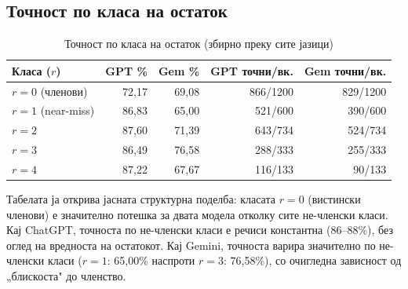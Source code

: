 \documentclass[12pt,a4paper]{article}
\theoremstyle{definition}
\begin{document}
\subsection{Точност по класа на остаток}
\label{subsec:residue_accuracy}

\begin{table}[H]
\centering
\begin{tabular}{lrrrr}
\toprule
\textbf{Класа ($r$)} & \textbf{GPT \%} & \textbf{Gem \%} & \textbf{GPT точни/вк.} & \textbf{Gem точни/вк.} \\
\midrule
$r=0$ (членови)     & 72,17 & 69,08 & 866/1200  & 829/1200  \\
$r=1$ (near-miss)   & 86,83 & 65,00 & 521/600   & 390/600   \\
$r=2$               & 87,60 & 71,39 & 643/734   & 524/734   \\
$r=3$               & 86,49 & 76,58 & 288/333   & 255/333   \\
$r=4$               & 87,22 & 67,67 & 116/133   & 90/133    \\
\bottomrule
\end{tabular}
\caption{Точност по класа на остаток (збирно преку сите јазици)}
\end{table}

Табелата ја открива јасната структурна поделба: класата $r=0$ (вистински членови) е значително потешка за двата модела отколку сите не-членски класи. Кај ChatGPT, точноста по не-членски класи е речиси константна (86--88\%), без оглед на вредноста на остатокот. Кај Gemini, точноста варира значително по не-членски класи ($r=1$: 65,00\% наспроти $r=3$: 76,58\%), со очигледна зависност од „блискоста" до членство.
\end{document}
